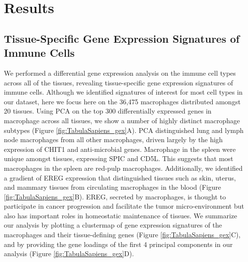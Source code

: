 \section{Results}

\subsection{Tissue-Specific Gene Expression Signatures of Immune Cells}

We performed a differential gene expression analysis on the immune cell types across all of the tissues, revealing tissue-specific gene expression signatures of immune cells. Although we identified signatures of interest for most cell types in our dataset, here we focus here on the 36,475 macrophages distributed amongst 20 tissues. Using PCA on the top 300 differentially expressed genes in macrophage across all tissues, we show a number of highly distinct macrophage subtypes (Figure \ref{fig:TabulaSapiens_gex}A). PCA distinguished lung and lymph node macrophages from all other macrophages, driven largely by the high expression of CHIT1 and anti-microbial genes. Macrophage in the spleen were unique amongst tissues, expressing SPIC and CD5L. This suggests that most macrophages in the spleen are red-pulp macrophages. Additionally, we identified a gradient of EREG expression that distinguished tissues such as skin, uterus, and mammary tissues from circulating macrophages in the blood (Figure \ref{fig:TabulaSapiens_gex}B). EREG, secreted by macrophages, is thought to participate in cancer progression and facilitate the tumor micro-environment but also has important roles in homeostatic maintenance of tissues. We summarize our analysis by plotting a clustermap of gene expression signatures of the macrophages and their tissue-defining genes (Figure \ref{fig:TabulaSapiens_gex}C), and by providing the gene loadings of the first 4 principal components in our analysis (Figure \ref{fig:TabulaSapiens_gex}D). 
